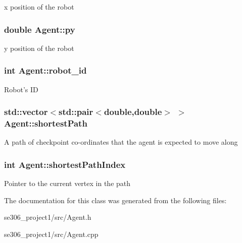 x position of the robot \hypertarget{classAgent_a048e8b32d02a2fd58f046a444a287015}{
\subsubsection[{py}]{\setlength{\rightskip}{0pt plus 5cm}double Agent\-::py\hspace{0.3cm}{\ttfamily [protected]}}}\label{classAgent_a048e8b32d02a2fd58f046a444a287015}
y position of the robot \hypertarget{classAgent_aefcf2085a669d7e91d932e7cc3ee88ce}{
\subsubsection[{robot\-\_\-id}]{\setlength{\rightskip}{0pt plus 5cm}int Agent\-::robot\-\_\-id\hspace{0.3cm}{\ttfamily [protected]}}}\label{classAgent_aefcf2085a669d7e91d932e7cc3ee88ce}
Robot's I\-D \hypertarget{classAgent_ac7175c1ed11e2b571d434bd25f4c096f}{
\subsubsection[{shortest\-Path}]{\setlength{\rightskip}{0pt plus 5cm}std\-::vector$<$std\-::pair$<$double,double$>$ $>$ Agent\-::shortest\-Path\hspace{0.3cm}{\ttfamily [protected]}}}\label{classAgent_ac7175c1ed11e2b571d434bd25f4c096f}
A path of checkpoint co-\/ordinates that the agent is expected to move along \hypertarget{classAgent_aa1f106d069420fb5995338cfa4f8799b}{
\subsubsection[{shortest\-Path\-Index}]{\setlength{\rightskip}{0pt plus 5cm}int Agent\-::shortest\-Path\-Index\hspace{0.3cm}{\ttfamily [protected]}}}\label{classAgent_aa1f106d069420fb5995338cfa4f8799b}
Pointer to the current vertex in the path 

The documentation for this class was generated from the following files\-:\begin{DoxyCompactItemize}
\item 
se306\-\_\-project1/src/Agent.\-h\item 
se306\-\_\-project1/src/Agent.\-cpp\end{DoxyCompactItemize}
